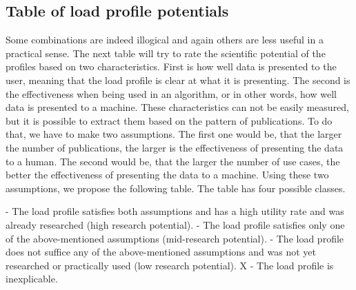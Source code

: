 \subsection{Table of load profile potentials} \label{subsec:potential}

Some combinations are indeed illogical and again others are less useful in a practical sense.
The next table will try to rate the scientific potential of the profiles based on two characteristics. 
First is how well data is presented to the user,
meaning that the load profile is clear at what it is presenting.
The second is the effectiveness when being used in an algorithm, or in other words, how well data is presented to a machine. 
These characteristics can not be easily measured,
but it is possible to extract them based on the pattern of publications.
To do that, we have to make two assumptions.
The first one would be, that the larger the number of publications, the larger is the effectiveness of presenting the data to a human.
The second would be, that the larger the number of use cases, the better the effectiveness of presenting the data to a machine.
Using these two assumptions, we propose the following table. 
The table has four possible classes. 

\begin{outline} 
 - The load profile satisfies both assumptions and has a high utility rate and was already researched (high research potential). 
 - The load profile satisfies only one of the above-mentioned assumptions (mid-research potential).
 - The load profile does not suffice any of the above-mentioned assumptions and was not yet researched or practically used (low research potential).
\1 X - The load profile is inexplicable.
\end{outline}

